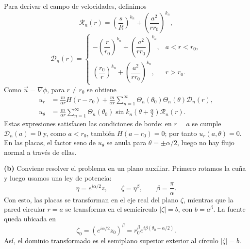 \documentclass[11pt]{article}
\newcommand{\inciso}[1]{\vspace{0.35em}\noindent\textbf{(#1)}\enspace}
\begin{document}
Para derivar el campo de velocidades, definimos
\begin{equation}
\mathcal R_n(r)=\left(\frac{s}{R}\right)^{k_n}
+\left(\frac{a^2}{rr_0}\right)^{k_n},
\label{eq:Rn-p3}
\end{equation}
\begin{equation}
\mathcal D_n(r)=
\begin{cases}
-\left(\dfrac{r}{r_0}\right)^{k_n}
+\left(\dfrac{a^2}{rr_0}\right)^{k_n}, & a<r<r_0,\\[0.6em]
\left(\dfrac{r_0}{r}\right)^{k_n}
+\left(\dfrac{a^2}{rr_0}\right)^{k_n}, & r>r_0.
\end{cases}
\label{eq:Dn-p3}
\end{equation}
Como $\vec u=\nabla\phi$, para $r\ne r_0$ se obtiene
\begin{equation}
\boxed{
\begin{aligned}
u_r&=\frac{m}{\alpha r}H(r-r_0)
+\frac{m}{\alpha r}\sum_{n=1}^{\infty}
\Theta_n(\theta_0)\Theta_n(\theta)\mathcal D_n(r),\\
u_\theta&=\frac{m}{\alpha r}\sum_{n=1}^{\infty}
\Theta_n(\theta_0)
\sin k_n\left(\theta+\frac{\alpha}{2}\right)\mathcal R_n(r).
\end{aligned}}
\label{eq:vel-separacion}
\end{equation}
Estas expresiones satisfacen las condiciones de borde: en $r=a$ se cumple $\mathcal D_n(a)=0$ y, como $a<r_0$, también $H(a-r_0)=0$; por tanto $u_r(a,\theta)=0$. En las placas, el factor seno de $u_\theta$ se anula para $\theta=\pm\alpha/2$, luego no hay flujo normal a través de ellas.

\inciso{b} Conviene resolver el problema en un plano auxiliar. Primero rotamos la cuña y luego usamos una ley de potencia:
\begin{equation}
\eta=e^{i\alpha/2}z,\qquad
\zeta=\eta^\beta,\qquad
\beta=\frac{\pi}{\alpha}.
\label{eq:mapeo}
\end{equation}
Con esto, las placas se transforman en el eje real del plano $\zeta$, mientras que la pared circular $r=a$ se transforma en el semicírculo $|\zeta|=b$, con $b=a^\beta$. La fuente queda ubicada en
\begin{equation}
\zeta_0=(e^{i\alpha/2}z_0)^\beta
=r_0^\beta e^{i\beta(\theta_0+\alpha/2)}.
\label{eq:zeta0-p3}
\end{equation}
Así, el dominio transformado es el semiplano superior exterior al círculo $|\zeta|=b$.
\end{document}
